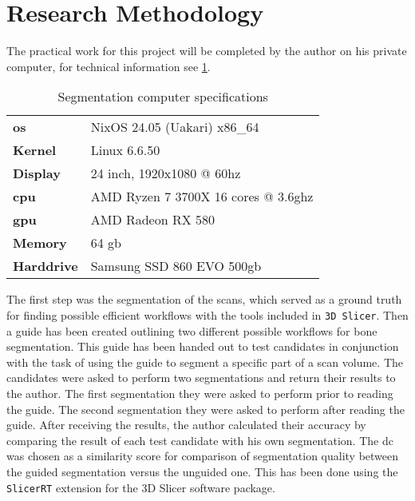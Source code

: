 \section{Research Methodology}
\label{s:introduction-researchmethodology}
The practical work for this project will be completed by the author on his private computer, for technical information see \cref{t:computer-specs}.
\begin{table}[ht]
	\label{t:computer-specs}
	\caption{Segmentation computer specifications}
	\begin{center}
		\begin{tabular}{l l}
			\textbf{\acrshort{os}}  & NixOS 24.05 (Uakari) x86\_64                   \\
			\textbf{Kernel}         & Linux 6.6.50                                   \\
			\textbf{Display}        & 24 inch, 1920x1080 @ 60\acrshort{hz}           \\
			\textbf{\acrshort{cpu}} & AMD Ryzen 7 3700X 16 cores @ 3.6\acrshort{ghz} \\
			\textbf{\acrshort{gpu}} & AMD Radeon RX 580                              \\
			\textbf{Memory}         & 64 \acrshort{gb}                               \\
			\textbf{Harddrive}      & Samsung SSD 860 EVO 500\acrshort{gb}
		\end{tabular}
	\end{center}
\end{table}
\noindent
The first step was the segmentation of the \mct\space scans, which served as a ground truth for finding possible efficient workflows with the tools included in \texttt{3D Slicer}.
Then a guide has been created outlining two different possible workflows for bone segmentation.
This guide has been handed out to test candidates in conjunction with the task of using the guide to segment a specific part of a scan volume.
The candidates were asked to perform two segmentations and return their results to the author.
The first segmentation they were asked to perform prior to reading the guide.
The second segmentation they were asked to perform after reading the guide.
After receiving the results, the author calculated their accuracy by comparing the result of each test candidate with his own segmentation.
The \acrfull{dc} \cite{diceMeasuresAmountEcologic1945} was chosen as a similarity score for comparison of segmentation quality between the guided segmentation versus the unguided one.
This has been done using the \texttt{SlicerRT} \cite{pinterSlicerRTRadiationTherapy2012} extension for the 3D Slicer software package.

